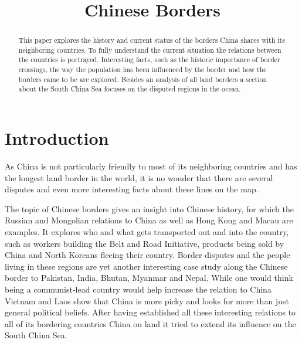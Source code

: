 \documentclass[conference]{IEEEtran}
\begin{document}
	
	\title{Chinese Borders}
	
	\author{
	}
	
	\maketitle
	
	\begin{abstract}
		This paper explores the history and current status of the borders China shares with its neighboring countries. To fully understand the current situation the relations between the countries is portrayed. Interesting facts, such as the historic importance of border crossings, the way the population has been influenced by the border and how the borders came to be are explored. Besides an analysis of all land borders a section about the South China Sea focuses on the disputed regions in the ocean.
	\end{abstract}
	\section{Introduction}
	As China is not particularly friendly to most of its neighboring countries and has the longest land border in the world, it is no wonder that there are several disputes and even more interesting facts about these lines on the map.
	
	The topic of Chinese borders gives an insight into Chinese history, for which the Russian and Mongolian relations to China as well as Hong Kong and Macau are examples. It explores who and what gets transported out and into the country, such as workers building the Belt and Road Initiative, products being sold by China and North Koreans fleeing their country. Border disputes and the people living in these regions are yet another interesting case study along the Chinese border to Pakistan, India, Bhutan, Myanmar and Nepal. While one would think being a communist-lead country would help increase the relation to China Vietnam and Laos show that China is more picky and looks for more than just general political beliefs. After having established all these interesting relations to all of its bordering countries China on land it tried to extend its influence on the South China Sea. 
	
\end{document}
